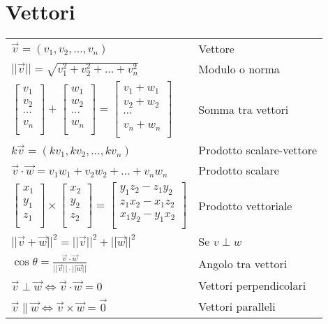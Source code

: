 \section{Vettori}
\begin{tabular}{@{}ll@{}}
	$\vec{v} = (v_1, v_2, ..., v_n)$ & Vettore \\
	$||\vec{v}|| = \sqrt{v_1^2 + v_2^2 + ... + v_n^2}$ & Modulo o norma \\
	$
		\begin{bmatrix}
			v_1 \\[-0.3em]
			v_2 \\[-0.3em]
			\cdots \\[-0.3em]
			v_n \\
		\end{bmatrix}
		+
		\begin{bmatrix}
			w_1 \\[-0.3em]
			w_2 \\[-0.3em]
			\cdots \\[-0.3em]
			w_n \\
		\end{bmatrix}
		=
		\begin{bmatrix}
			v_1 + w_1 \\[-0.3em]
			v_2 + w_2 \\[-0.3em]
			\cdots \\[-0.3em]
			v_n + w_n \\
		\end{bmatrix}
	$ & Somma tra vettori \\
	$k \vec{v} = (k v_1, k v_2, ..., k v_n)$ & Prodotto scalare-vettore \\
	$\vec{v} \cdot \vec{w} = v_1 w_1 + v_2 w_2 + ... + v_n w_n$ & Prodotto scalare \\
	$
	\begin{bmatrix}
		x_1 \\[-0.3em]
		y_1 \\[-0.3em]
		z_1 \\
	\end{bmatrix}
	\times
	\begin{bmatrix}
		x_2 \\[-0.3em]
		y_2 \\[-0.3em]
		z_2 \\
	\end{bmatrix}
	=
	\begin{bmatrix}
		y_1z_2 - z_1y_2 \\[-0.3em]
		z_1x_2 - x_1z_2 \\[-0.3em]
		x_1y_2 - y_1x_2 \\
	\end{bmatrix}
	$ & Prodotto vettoriale \\
	$||\vec{v}+\vec{w}||^2 = ||\vec{v}||^2 + ||\vec{w}||^2$ & Se $v \perp w$ \\
	$\cos{\theta} = \frac{\vec{v} \cdot \vec{w}}{||\vec{v}|| \cdot ||\vec{w}||}$ & Angolo tra vettori \\
	$\vec{v} \perp \vec{w} \iff \vec{v} \cdot \vec{w} = 0$ & Vettori perpendicolari \\
	$\vec{v} \parallel \vec{w} \iff \vec{v} \times \vec{w} = \vec{0}$ & Vettori paralleli \\
\end{tabular}